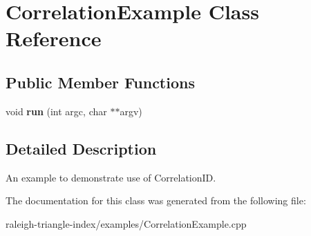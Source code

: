 \section{Correlation\+Example Class Reference}
\label{class_correlation_example}
\subsection*{Public Member Functions}
\begin{DoxyCompactItemize}
\item 
void {\bfseries run} (int argc, char $\ast$$\ast$argv)\label{class_correlation_example_a04b7d8395553eefac3a5e22b375ccac0}

\end{DoxyCompactItemize}


\subsection{Detailed Description}
An example to demonstrate use of Correlation\+ID. 

The documentation for this class was generated from the following file\+:\begin{DoxyCompactItemize}
\item 
raleigh-\/triangle-\/index/examples/Correlation\+Example.\+cpp\end{DoxyCompactItemize}
